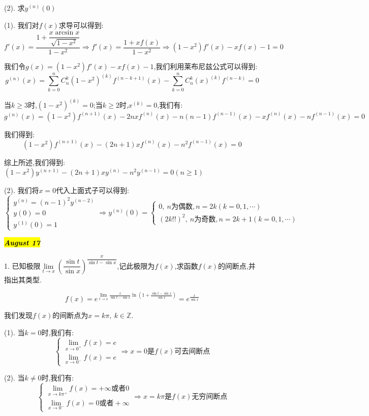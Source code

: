 (2). 求$y^{(n)}(0)$
\begin{solution}

	(1). 我们对$f(x)$求导可以得到:  
	$$f'(x)=\dfrac{1+\dfrac{x\arcsin x}{\sqrt{1-x^2}}}{1-x^2}\Rightarrow f'(x)=\dfrac{1+xf(x)}{1-x^2}\Rightarrow (1-x^2)f'(x)-xf(x)-1=0$$
	
	我们令$g(x)=(1-x^2)f'(x)-xf(x)-1$,我们利用莱布尼兹公式可以得到:  
	$$g^{(n)}(x)=\sum\limits_{k=0}^{n}C_{n}^{k}(1-x^2)^{(k)}f^{(n-k+1)}(x)-\sum\limits_{k=0}^{n}C_{n}^{k}(x)^{(k)}f^{(n-k)}=0$$
	
	当$k\geq 3$时,$(1-x^2)^{(k)}=0$;当$k\geq 2$时,$x^{(k)}=0$,我们有:  
	$$g^{(n)}(x)=(1-x^2)f^{(n+1)}(x)-2nxf^{(n)}(x)-n(n-1)f^{(n-1)}(x)-xf^{(n)}(x)-nf^{(n-1)}(x)=0$$
	
	我们得到:  
	$$(1-x^2)f^{(n+1)}(x)-(2n+1)xf^{(n)}(x)-n^2f^{(n-1)}(x)=0$$
	
	综上所述,我们得到:  $(1-x^2)y^{(n+1)}-(2n+1)xy^{(n)}-n^2y^{(n-1)}=0(n\geq 1)$
	
	(2). 我们将$x=0$代入上面式子可以得到:  
	$$\left\lbrace 
	\begin{array}{l}
		y^{(n)}=(n-1)^2y^{(n-2)}\\
		y(0)=0\\
		y^{(1)}(0)=1
	\end{array}
	\right. \Rightarrow y^{(n)}(0)=\left\lbrace 
	\begin{array}{l}
		0,\ n\text{为偶数},n=2k(k=0,1,\cdots)\\
		(2k!!)^2,\ n\text{为奇数},n=2k+1(k=0,1,\cdots)
	\end{array}
	\right. $$
\end{solution}

\hl{\textbf{\textit{August 17}}}

1. 已知极限$\lim\limits_{t\rightarrow x}\left(\dfrac{\sin t}{\sin x} \right)^{\dfrac{x}{\sin t-\sin x}}$,记此极限为$f(x)$,求函数$f(x)$的间断点,并指出其类型.
\begin{solution}

	$$f(x)=e^{\lim\limits_{t\rightarrow x}\frac{x}{\sin t-\sin x}\ln(1+\frac{\sin t-\sin x}{\sin x})}=e^{\frac{x}{\sin x}}$$
	
	我们发现$f(x)$的间断点为$x=k\pi,\ k\in\mathbb{Z}$.
	
	(1). 当$k=0$时,我们有:
	$$\left\lbrace 
	\begin{array}{l}
		\lim\limits_{x\rightarrow 0^{+}}f(x)=e\\
		\lim\limits_{x\rightarrow 0^{-}}f(x)=e
	\end{array}
	\right. \Rightarrow x=0\text{是}f(x)\text{可去间断点}$$
	
	(2). 当$k\neq 0$时,我们有:
	$$\left\lbrace 
	\begin{array}{l}
		\lim\limits_{x\rightarrow k\pi^{+}}f(x)=+\infty\text{或者}0\\
		\lim\limits_{x\rightarrow 0^{-}}f(x)=0\text{或者}+\infty
	\end{array}
	\right. \Rightarrow x=k\pi\text{是}f(x)\text{无穷间断点}$$
\end{solution}

